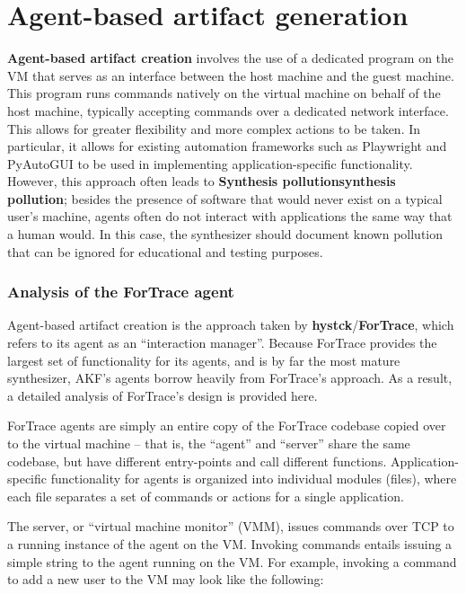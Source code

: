\section{Agent-based artifact
generation}\label{agent-based-artifact-generation}

\textbf{Agent-based artifact creation} involves the use of a dedicated
program on the VM that serves as an interface between the host machine
and the guest machine. This program runs commands natively on the
virtual machine on behalf of the host machine, typically accepting
commands over a dedicated network interface. This allows for greater
flexibility and more complex actions to be taken. In particular, it
allows for existing automation frameworks such as Playwright and
PyAutoGUI to be used in implementing application-specific functionality.
However, this approach often leads to \textbf{Synthesis
pollution\textbar synthesis pollution}; besides the presence of software
that would never exist on a typical user's machine, agents often do not
interact with applications the same way that a human would. In this
case, the synthesizer should document known pollution that can be
ignored for educational and testing purposes.

\subsubsection{Analysis of the ForTrace
agent}\label{analysis-of-the-fortrace-agent}

Agent-based artifact creation is the approach taken by
\textbf{hystck}/\textbf{ForTrace}, which refers to its agent as an
``interaction manager''. Because ForTrace provides the largest set of
functionality for its agents, and is by far the most mature synthesizer,
AKF's agents borrow heavily from ForTrace's approach. As a result, a
detailed analysis of ForTrace's design is provided here.

ForTrace agents are simply an entire copy of the ForTrace codebase
copied over to the virtual machine -- that is, the ``agent'' and
``server'' share the same codebase, but have different entry-points and
call different functions. Application-specific functionality for agents
is organized into individual modules (files), where each file separates
a set of commands or actions for a single application.

The server, or ``virtual machine monitor'' (VMM), issues commands over
TCP to a running instance of the agent on the VM. Invoking commands
entails issuing a simple string to the agent running on the VM. For
example, invoking a command to add a new user to the VM may look like
the following:

